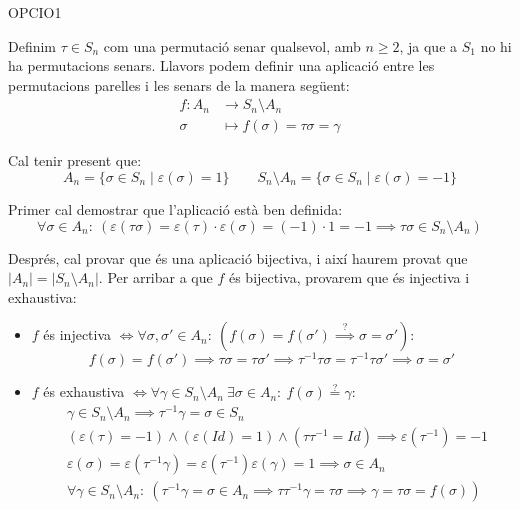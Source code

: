 \documentclass[a4paper, 11pt]{article}
\newcommand{\tq}{:\ }
\begin{document}
\begin{enumerate}
		OPCIO1

		Definim $\tau \in S_n$ com una permutació senar qualsevol, amb $n \geq 2$, ja que a $S_1$ no hi ha permutacions senars. Llavors podem definir una aplicació entre les permutacions parelles i les senars de la manera següent:	
		\[\begin{aligned}
			f: A_n & \longrightarrow S_n \setminus A_n \\
			 \sigma & \longmapsto f(\sigma) = \tau \sigma = \gamma
		\end{aligned}\]
		
		Cal tenir present que:
		\[A_n = \{\sigma \in S_n \mid \varepsilon (\sigma) = 1\} \qquad S_n \setminus A_n = \{\sigma \in S_n \mid \varepsilon (\sigma) = -1\}\]
		
		Primer cal demostrar que l'aplicació està ben definida:
		\[\forall \sigma \in A_n \tq (\varepsilon (\tau\sigma) = \varepsilon (\tau) \cdot \varepsilon (\sigma) = (-1) \cdot 1 = -1 \implies \tau\sigma \in S_n \setminus A_n)\]
		
		Després, cal provar que és una aplicació bijectiva, i així haurem provat que $|A_n| = |S_n \setminus A_n|$. Per arribar a que $f$ és bijectiva, provarem que és injectiva i exhaustiva:
		\begin{itemize}
			\item $f$ és injectiva $\iff \forall \sigma, \sigma' \in A_n \tq (f(\sigma) = f(\sigma') \overset{?}{\implies} \sigma = \sigma')$:
				\[f(\sigma) = f(\sigma') \implies \tau \sigma = \tau \sigma' \implies \tau^{-1} \tau \sigma = \tau^{-1} \tau \sigma' \implies \sigma = \sigma'\]	
			\item $f$ és exhaustiva $\iff \forall \gamma \in S_n \setminus A_n \  \exists \sigma \in A_n \tq f(\sigma) \overset{?}{=} \gamma$:
				\[\begin{aligned}
					&\gamma \in S_n \setminus A_n \implies \tau^{-1} \gamma = \sigma \in S_n \\
					&(\varepsilon (\tau) = -1) \land (\varepsilon (Id) = 1) \land (\tau \tau^{-1} = Id) \implies \varepsilon (\tau^{-1}) = -1 \\
					&\varepsilon (\sigma) = \varepsilon (\tau^{-1} \gamma) = \varepsilon (\tau^{-1}) \varepsilon (\gamma) = 1 \implies \sigma \in A_n \\
					&\forall \gamma \in S_n \setminus A_n \tq (\tau^{-1} \gamma = \sigma \in A_n \implies \tau \tau^{-1} \gamma = \tau \sigma \implies \gamma = \tau \sigma = f(\sigma))
				\end{aligned}\]
		\end{itemize}


\end{enumerate}
\end{document}

